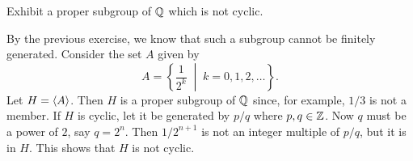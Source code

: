  Exhibit a proper subgroup of $\mathbb{Q}$ which is not cyclic.
\begin{solution}
  By the previous exercise, we know that such a subgroup cannot be
  finitely generated. Consider the set $A$ given by
  \begin{equation*}
    A = \left\{\frac1{2^k} \;\middle|\; k = 0,1,2,\dots\right\}.
  \end{equation*}
  Let $H = \langle{A}\rangle$. Then $H$ is a proper subgroup of $\mathbb{Q}$ since, for
  example, $1/3$ is not a member. If $H$ is cyclic, let it be
  generated by $p/q$ where $p,q\in\mathbb{Z}$. Now $q$ must be a power of $2$,
  say $q = 2^n$. Then $1/2^{n+1}$ is not an integer multiple of $p/q$,
  but it is in $H$. This shows that $H$ is not cyclic.
\end{solution}
